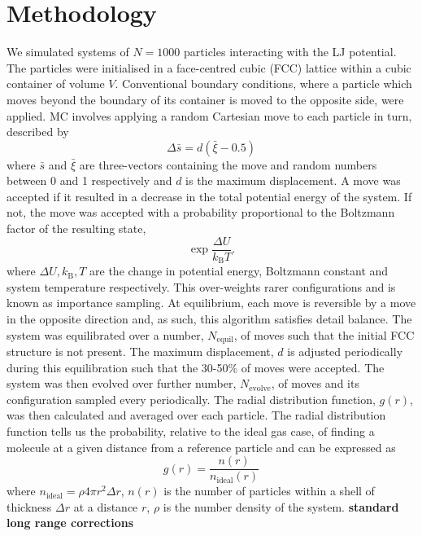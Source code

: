 \documentclass[10pt, twocolumn]{revtex4}    %
\begin{document}
\section{Methodology} \label{s:methods}
We simulated systems of $N=1000$ particles interacting with the LJ potential. The particles were initialised in a face-centred cubic (FCC) lattice within a cubic container of volume $V$. Conventional boundary conditions, where a particle which moves beyond the boundary of its container is moved to the opposite side, were applied.
MC involves applying a random Cartesian move to each particle in turn, described by
\begin{displaymath}
\Delta{}\bar{s} = d\left(\bar{\xi}-0.5\right)
\end{displaymath}
where $\bar{s}$ and $\bar{\xi}$ are three-vectors containing the move and random numbers between 0 and 1 respectively and $d$ is the maximum displacement.
A move was accepted if it resulted in a decrease in the total potential energy of the system. If not, the move was accepted with a probability proportional to the Boltzmann factor of the resulting state,
\begin{displaymath}
\exp{\frac{\Delta{}U}{k_\text{B}T}}.
\end{displaymath}
where $\Delta{}U, k_\text{B}, T$ are the change in potential energy, Boltzmann constant and system temperature respectively.
This over-weights rarer configurations and is known as importance sampling. At equilibrium, each move is reversible by a move in the opposite direction and, as such, this algorithm satisfies detail balance.
The system was equilibrated over a number, $N_\text{equil}$, of moves such that the initial FCC structure is not present. The maximum displacement, $d$ is adjusted periodically during this equilibration such that the 30-50\% of moves were accepted.
The system was then evolved over further number, $N_\text{evolve}$, of moves and its configuration sampled every periodically. The radial distribution function, $g(r)$, was then calculated and averaged over each particle. The radial distribution function tells us the probability, relative to the ideal gas case, of finding a molecule at a given distance from a reference particle and can be expressed as
\begin{displaymath}
g(r) = \frac{n(r)}{n_\text{ideal}(r)}
\end{displaymath}
where $n_\text{ideal} = \rho{}4\pi{}r^{2}\Delta{}r$, $n(r)$ is the number of particles within a shell of thickness $\Delta{}r$ at a distance $r$, $\rho{}$ is the number density of the system. \textbf{standard long range corrections}
\end{document}
